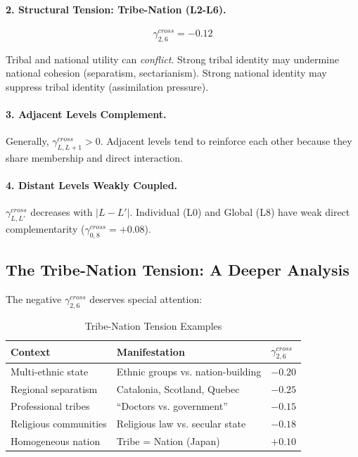 \paragraph{2. Structural Tension: Tribe-Nation (L2-L6).}
$$\gamma^{cross}_{2,6} = -0.12$$

Tribal and national utility can \emph{conflict}. Strong tribal identity may
undermine national cohesion (separatism, sectarianism). Strong national
identity may suppress tribal identity (assimilation pressure).

\paragraph{3. Adjacent Levels Complement.}
Generally, $\gamma^{cross}_{L,L+1} > 0$. Adjacent levels tend to reinforce
each other because they share membership and direct interaction.

\paragraph{4. Distant Levels Weakly Coupled.}
$\gamma^{cross}_{L,L'}$ decreases with $|L - L'|$. Individual (L0) and Global (L8)
have weak direct complementarity ($\gamma^{cross}_{0,8} = +0.08$).

\subsection{The Tribe-Nation Tension: A Deeper Analysis}

The negative $\gamma^{cross}_{2,6}$ deserves special attention:

\begin{table}[htbp]
\centering
\caption{Tribe-Nation Tension Examples}
\label{tab:aaa-tribe-nation}
\renewcommand{\arraystretch}{1.3}
\begin{tabular}{@{}lll@{}}
\toprule
\textbf{Context} & \textbf{Manifestation} & \textbf{$\gamma^{cross}_{2,6}$} \\
\midrule
Multi-ethnic state & Ethnic groups vs. nation-building & $-0.20$ \\
Regional separatism & Catalonia, Scotland, Quebec & $-0.25$ \\
Professional tribes & ``Doctors vs. government'' & $-0.15$ \\
Religious communities & Religious law vs. secular state & $-0.18$ \\
Homogeneous nation & Tribe = Nation (Japan) & $+0.10$ \\
\bottomrule
\end{tabular}
\end{table}

